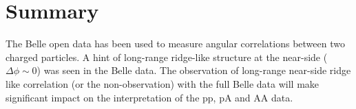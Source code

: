 \section{Summary}

The Belle open data has been used to measure angular correlations between
two charged particles. A hint of long-range ridge-like structure at the
near-side ($\Delta\phi\sim 0$) was seen in the Belle data. The observation of
long-range near-side ridge like correlation (or the non-observation) with the full Belle data will make significant impact on the interpretation of the pp, pA and AA data.

